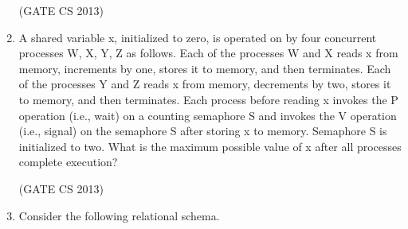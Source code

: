 \documentclass[a4paper, 11pt]{article}
\begin{document}
\begin{enumerate}
     \hfill (GATE CS 2013)

     \item A shared variable x, initialized to zero, is operated on by four concurrent processes W, X, Y, Z as follows. Each of the processes W and X reads x from memory, increments by one, stores it to memory, and then terminates. Each of the processes Y and Z reads x from memory, decrements by two, stores it to memory, and then terminates. Each process before reading x invokes the P operation (i.e., wait) on a counting semaphore S and invokes the V operation (i.e., signal) on the semaphore S after storing x to memory. Semaphore S is initialized to two. What is the maximum possible value of x after all processes complete execution? 
     \begin{enumerate}
     \end{enumerate}
\hfill (GATE CS 2013)
     \item  Consider the following relational schema. 
     

\end{enumerate}
\end{document}
